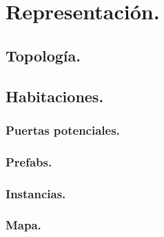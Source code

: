 \chapter{Representación.}\label{cap:capitulo3}




\section{Topología.}



\section{Habitaciones.}


\subsection{Puertas potenciales.}

\subsection{Prefabs.}

\subsection{Instancias.}

\subsection{Mapa.}

